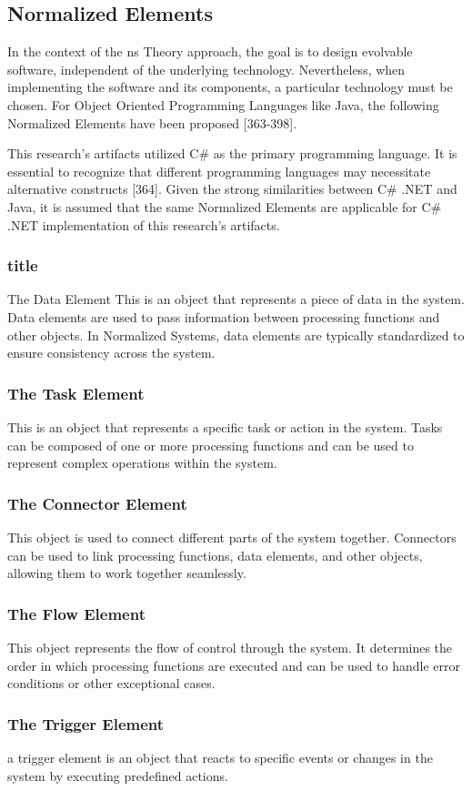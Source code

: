 \subsection{Normalized Elements} \label{subsec:ns_elements} 

In the context of the \gls{ns} Theory approach, the goal is to design evolvable software,
independent of the underlying technology. Nevertheless, when implementing the software and
its components, a particular technology must be chosen. For Object Oriented Programming
Languages like Java, the following Normalized Elements have been proposed
\parencite{mannaert_normalized_2016}[363-398].

This research's artifacts utilized C\# as the primary programming language. It is essential
to recognize that different programming languages may necessitate alternative constructs
\parencite{mannaert_normalized_2016}[364]. Given the strong similarities between C\# .NET
and Java, it is assumed that the same Normalized Elements are applicable for C\# .NET
implementation of this research's artifacts.

\subsubsection*{title}{The Data Element}
This is an object that represents a piece of data in the system. Data elements are used to
pass information between processing functions and other objects. In Normalized Systems,
data elements are typically standardized to ensure consistency across the system.

\subsubsection*{The Task Element}
This is an object that represents a specific task or action in the system. Tasks can be
composed of one or more processing functions and can be used to represent complex
operations within the system.

\subsubsection*{The Connector Element}
This object is used to connect different parts of the system together. Connectors can be
used to link processing functions, data elements, and other objects, allowing them to work
together seamlessly.

\subsubsection*{The Flow Element}
This object represents the flow of control through the system. It determines the order in
which processing functions are executed and can be used to handle error conditions or
other exceptional cases.

\subsubsection*{The Trigger Element}
a trigger element is an object that reacts to specific events or changes in the system
by executing predefined actions.